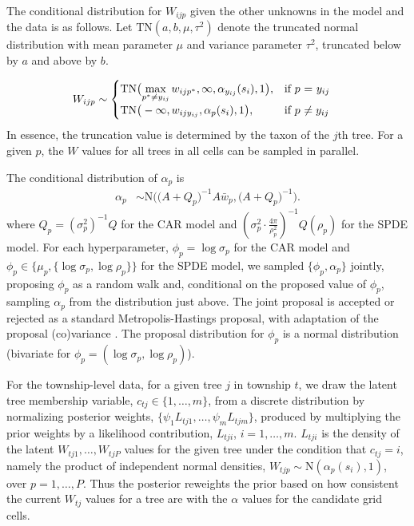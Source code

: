 \documentclass[12pt]{article}\usepackage[]{graphicx}\usepackage[]{color}
\begin{document}
The conditional distribution for $W_{ijp}$ given the other unknowns
in the model and the data is as follows. Let $\mbox{TN}(a,b,\mu,\tau^{2})$
denote the truncated normal distribution with mean parameter $\mu$
and variance parameter $\tau^{2}$, truncated below by $a$ and above
by $b$. 

\begin{align}
W_{ijp} & \sim\begin{cases}
\mbox{TN}\big({\displaystyle \max_{p^{*}\neq y_{ij}}w_{ijp^{*}},\infty,\alpha_{y_{ij}}(s_{i}),1\big),} & \mbox{if }p\mbox{ = \ensuremath{y_{ij}}}\\
\mbox{TN}\big(-\infty,w_{ijy_{ij}},\alpha_{p}(s_{i}),1\big), & \mbox{if }p\mbox{ \ensuremath{\neq y_{ij}}}
\end{cases}\label{sampW}
\end{align}
In essence, the truncation value is determined by the taxon of the
$j$th tree. For a given $p$, the $W$ values for all trees in all
cells can be sampled in parallel. 

The conditional distribution of $\alpha_{p}$ is 
\begin{align}
\alpha_{p} & \sim\mbox{N}\bigg(\Big(A+Q_{p}\Big)^{-1}A\bar{w}_{p},\Big(A+Q_{p}\Big)^{-1}\bigg).\label{sampalpha}
\end{align}
where $Q_{p}=(\sigma_{p}^{2})^{-1}Q$ for the CAR model and $\left(\sigma_{p}^{2}\cdot\frac{4\pi}{\rho_{p}^{2}}\right)^{-1}Q(\rho_{p})$
for the SPDE model. For each hyperparameter, $\phi_{p}=\log\sigma_{p}$
for the CAR model and $\phi_{p}\in\{\mu_{p},\{\log\sigma_{p},\log\rho_{p}\}\}$
for the SPDE model, we sampled $\{\phi_{p},\alpha_{p}\}$ jointly,
proposing $\phi_{p}$ as a random walk and, conditional on the proposed
value of $\phi_{p}$, sampling $\alpha_{p}$ from the distribution
just above. The joint proposal is accepted or rejected as a standard
Metropolis-Hastings proposal, with adaptation of the proposal (co)variance
\citep{Shab:Well:2011}. The proposal distribution for $\phi_{p}$
is a normal distribution (bivariate for $\phi_{p}=(\log\sigma_{p},\log\rho_{p})$).

\noindent 

For the township-level data, for a given tree $j$ in township $t$,
we draw the latent tree membership variable, $c_{tj}\in\{1,\ldots,m\}$,
from a discrete distribution by normalizing posterior weights, $\{\psi_{1}L_{tj1},\ldots,\psi_{m}L_{tjm}\}$,
produced by multiplying the prior weights by a likelihood contribution,
$L_{tji}$, $i=1,\ldots,m$. $L_{tji}$ is the density of the latent
$W_{tj1},\ldots,W_{tjP}$ values for the given tree under the condition
that $c_{tj}=i$, namely the product of independent normal densities,
$W_{tjp}\sim\mbox{N}(\alpha_{p}(s_{i}),1)$, over $p=1,\ldots,P$.
Thus the posterior reweights the prior based on how consistent the
current $W_{tj}$ values for a tree are with the $\alpha$ values
for the candidate grid cells. 
\end{document}
